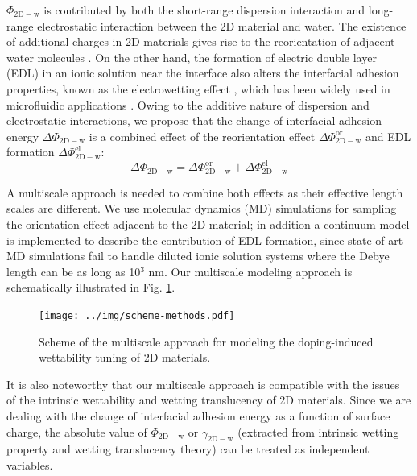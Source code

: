 \documentclass[aps,prl,reprint,groupedaddress,amsmath,amssymb, showpacs]{revtex4-1}
\begin{document}
\(\Phi_{\mathrm{2D-w}}\) is contributed by both the
short-range dispersion interaction and long-range electrostatic
interaction between the 2D material and water. The existence of
additional charges in 2D materials gives rise to the reorientation of
adjacent water molecules \cite{ostrowski_tunable_2014}. On the other
hand, the formation of electric double layer (EDL) in an ionic
solution near the interface also alters the interfacial adhesion
properties, known as the electrowetting effect \cite{Lippmann_1908},
which has been widely used in microfluidic applications
\cite{Mugele_2005}.  Owing to the additive nature of dispersion and
electrostatic interactions, we propose that the change of interfacial
adhesion energy \(\Delta \Phi_{\mathrm{2D-w}}\) is a combined effect of
the reorientation effect \(\Delta \Phi_{\mathrm{2D-w}}^{\mathrm{or}}\) and EDL
formation \(\Delta \Phi_{\mathrm{2D-w}}^{\mathrm{el}}\):
\begin{equation}
\label{eqn:contrib-adhesion-change}
\Delta \Phi_{\mathrm{2D-w}} = \Delta \Phi_{\mathrm{2D-w}}^{\mathrm{or}}
                              + \Delta \Phi_{\mathrm{2D-w}}^{\mathrm{el}}
\end{equation}

A multiscale approach is needed to combine both effects as their
effective length scales are different. We use molecular dynamics (MD)
simulations for sampling the orientation effect adjacent to the 2D
material; in addition a continuum model is implemented to describe the
contribution of EDL formation, since state-of-art MD simulations fail to
handle diluted ionic solution systems where the Debye length can be as
long as 10\(^{\text{3}}\) nm. Our multiscale modeling approach is schematically illustrated in Fig. \ref{fig:scheme-method}.

\begin{figure}[htbp]
\centering
\texttt{[image: ../img/scheme-methods.pdf]}
\caption{\label{fig:scheme-method}
Scheme of the multiscale approach for modeling the doping-induced wettability tuning of 2D materials.}
\end{figure}

It is also noteworthy that our multiscale approach is compatible with
the issues of the intrinsic wettability and wetting translucency of 2D
materials. Since we are dealing with the change of interfacial
adhesion energy as a function of surface charge, the absolute value of
\(\Phi_{\mathrm{2D-w}}\) or \(\gamma_{\mathrm{2D-w}}\) (extracted from intrinsic wetting property and wetting translucency theory) can be treated as
independent variables.
\end{document}
